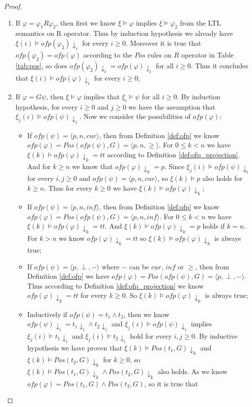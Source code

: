 \documentclass[conference]{IEEEtran}
\newtheorem{proof}{IEEEproof}
\def\phi{\varphi}
\def\tt{\mathit{tt}}
\def\ofp#1{\mathit{ofp}(#1)}
\def\nondeter{\perp}
\def\cur{\mathit{cur}}
\def\inf{\mathit{inf}}
\begin{document}
\begin{proof}
\begin{enumerate}
    \item If $\phi=\phi_1 R \phi_2$, then first we know $\xi\models\phi$ implies 
    $\xi\models\phi_2$ from the LTL semantics on R operator. Thus by induction hypothesis we already 
    have $\xi(i)\models \ofp{\phi_2}\!\downarrow_i$ for every $i\geq 0$. Moreover it is true that 
    $\ofp{\phi_2}=\ofp{\phi}$ according to the $Pos$ rules on $R$ operator in Table \ref{tab:pos}, so 
    does $\ofp{\phi_2}\!\downarrow_i=\ofp{\phi}\!\downarrow_i$ for all $i\geq 0$. Thus it concludes that 
    $\xi(i)\models \ofp{\phi}\!\downarrow_i$ for every $i\geq 0$;
    
    
    \item If $\phi=G\psi$, then $\xi\models\phi$ implies that $\xi_i\models\psi$ for all $i\geq 0$. 
    By induction hypothesis, for every $i\geq 0$ and $j\geq 0$ we have the assumption that 
    $\xi_j(i)\models \ofp{\psi}\!\downarrow_i$. Now we consider the possibilities of $\ofp{\phi}$:
    \begin{itemize}
      \item If $\ofp{\psi}=\langle p, n, \cur\rangle$, then from Definition \ref{def:ofp} 
      we know $\ofp{\phi}=Pos(\ofp{\psi}, G)=\langle p, n, \geq\rangle$. For $0\leq k < n$ we have $\xi(k)\models\ofp{\phi}\!\downarrow_k=\tt$ according to Definition \ref{def:ofp_projection}. And for $k\geq n$ we know 
      that $\ofp{\phi}\!\downarrow_k=p$. Since $\xi_j(i)\models \ofp{\psi}\!\downarrow_i$ for every $i,j\geq 0$ and $\ofp{\psi}=\langle p, n, \cur\rangle$, so $\xi(k)\models p$ also holds for $k\geq n$. 
      Thus for every $k\geq 0$ we have $\xi(k)\models\ofp{\phi}\!\downarrow_k$;
      \item If $\ofp{\psi}=\langle p, n, \inf\rangle$, then from Definition \ref{def:ofp} 
      we know $\ofp{\phi}=Pos(\ofp{\psi}, G)=\langle p, n, \inf\rangle$. For $0\leq k < n$ we have $\xi(k)\models\ofp{\phi}\!\downarrow_k=\tt$. And $\xi(k)\models\ofp{\phi}\!\downarrow_k=p$ holds if $k=n$. For $k> n$ we know $\ofp{\phi}\!\downarrow_k=\tt$ so $\xi(k)\models\ofp{\phi}\!\downarrow_k$ is always true;
      \item If $\ofp{\psi}=\langle p, \nondeter, -\rangle$ where $-$ can be $\cur$, $\inf$ or $\geq$, then 
      from Definition \ref{def:ofp} we have $\ofp{\phi}=Pos(\ofp{\psi}, G)=\langle p, \nondeter, -\rangle$. Thus according to Definition \ref{def:ofp_projection} we know $\ofp{\phi}\!\downarrow_k=\tt$ for every 
      $k\geq 0$. So $\xi(k)\models\ofp{\phi}\!\downarrow_k$ is always true;
      \item Inductively if $\ofp{\psi}=t_1\wedge t_2$, then we know $\ofp{\psi}\!\downarrow_i=t_1\!\downarrow_i\wedge t_2\!\downarrow_i$ and $\xi_j(i)\models \ofp{\psi}\!\downarrow_i$ implies $\xi_j(i)\models t_1\!\downarrow_i$ and $\xi_j(i)\models t_2\!\downarrow_i$ hold for every $i,j\geq 0$. By inductive hypothesis we have proven that $\xi(k)\models Pos(t_1, G)\!\downarrow_k$ and $\xi(k)\models Pos(t_2, G)\!\downarrow_k$ for $k\geq 0$, so $\xi(k)\models Pos(t_1, G)\!\downarrow_k\wedge Pos(t_2, G)\!\downarrow_k$ also holds. As we know $\ofp{\phi}=Pos(t_1,G)\wedge Pos(t_2,G)$, so it is true that 

\end{itemize}
\end{enumerate}
\end{proof}
\end{document}

